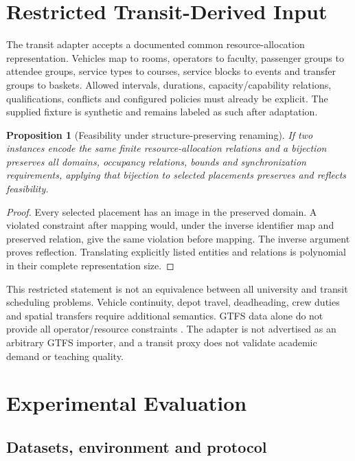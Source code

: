 \documentclass[pdflatex,sn-mathphys-num]{sn-jnl}
\theoremstyle{thmstyleone}
\newtheorem{proposition}[theorem]{Proposition}
\theoremstyle{thmstyletwo}
\theoremstyle{thmstylethree}
\begin{document}
\section{Restricted Transit-Derived Input}\label{sec:transit}

The transit adapter accepts a documented common resource-allocation representation. Vehicles map to rooms, operators to faculty, passenger groups to attendee groups, service types to courses, service blocks to events and transfer groups to baskets. Allowed intervals, durations, capacity/capability relations, qualifications, conflicts and configured policies must already be explicit. The supplied fixture is synthetic and remains labeled as such after adaptation.

\begin{proposition}[Feasibility under structure-preserving renaming]
If two instances encode the same finite resource-allocation relations and a bijection preserves all domains, occupancy relations, bounds and synchronization requirements, applying that bijection to selected placements preserves and reflects feasibility.
\end{proposition}
\begin{proof}
Every selected placement has an image in the preserved domain. A violated constraint after mapping would, under the inverse identifier map and preserved relation, give the same violation before mapping. The inverse argument proves reflection. Translating explicitly listed entities and relations is polynomial in their complete representation size.
\end{proof}
This restricted statement is not an equivalence between all university and transit scheduling problems. Vehicle continuity, depot travel, deadheading, crew duties and spatial transfers require additional semantics. GTFS data alone do not provide all operator/resource constraints \cite{D09}. The adapter is not advertised as an arbitrary GTFS importer, and a transit proxy does not validate academic demand or teaching quality.

\section{Experimental Evaluation}\label{sec:experiments}

\subsection{Datasets, environment and protocol}
\end{document}
